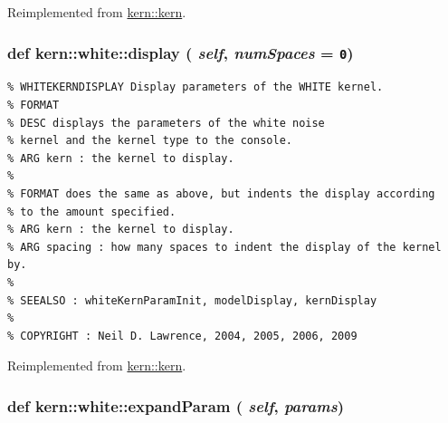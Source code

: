 Reimplemented from \hyperlink{classkern_1_1kern}{kern::kern}.\hypertarget{classkern_1_1white_ec5a23f33a26211bdfa4c8c5d0e022fe}{
\subsubsection[{display}]{\setlength{\rightskip}{0pt plus 5cm}def kern::white::display ( {\em self}, \/   {\em numSpaces} = {\tt 0})}}
\label{classkern_1_1white_ec5a23f33a26211bdfa4c8c5d0e022fe}




\footnotesize\begin{verbatim}% WHITEKERNDISPLAY Display parameters of the WHITE kernel.
% FORMAT
% DESC displays the parameters of the white noise
% kernel and the kernel type to the console.
% ARG kern : the kernel to display.
%
% FORMAT does the same as above, but indents the display according
% to the amount specified.
% ARG kern : the kernel to display.
% ARG spacing : how many spaces to indent the display of the kernel by.
%
% SEEALSO : whiteKernParamInit, modelDisplay, kernDisplay
%
% COPYRIGHT : Neil D. Lawrence, 2004, 2005, 2006, 2009

\end{verbatim}
\normalsize
 

Reimplemented from \hyperlink{classkern_1_1kern}{kern::kern}.\hypertarget{classkern_1_1white_da7b491984621299ab25fef437d4b1b2}{
\subsubsection[{expandParam}]{\setlength{\rightskip}{0pt plus 5cm}def kern::white::expandParam ( {\em self}, \/   {\em params})}}
\label{classkern_1_1white_da7b491984621299ab25fef437d4b1b2}




